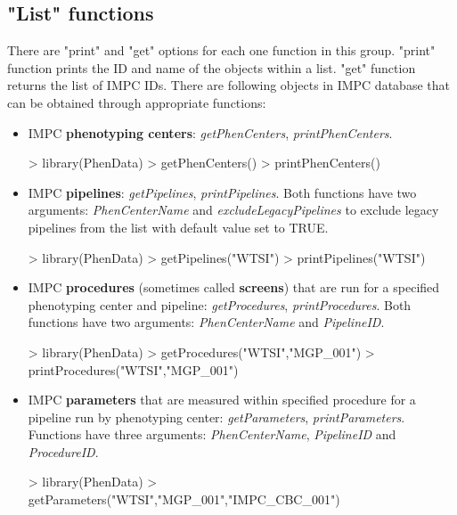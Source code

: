 \documentclass[a4paper]{article}
\begin{document}
\subsection*{"List" functions}
There are "print" and "get" options for each one function in this group. "print" function prints the ID and name of the objects within a list. "get" function returns the list of IMPC IDs. 
There are following objects in IMPC database that can be obtained through appropriate functions:
\begin{itemize}
\item IMPC \textbf{phenotyping centers}: \textit{getPhenCenters}, \textit{printPhenCenters}.
\begin{Schunk}
\begin{Sinput}
> library(PhenData)
> getPhenCenters()
> printPhenCenters()
\end{Sinput}
\end{Schunk}
\item IMPC \textbf{pipelines}: \textit{getPipelines}, \textit{printPipelines}. Both functions have two arguments: \textit{PhenCenterName} and \textit{excludeLegacyPipelines} to exclude legacy pipelines from the list with default value set to TRUE. 
\begin{Schunk}
\begin{Sinput}
> library(PhenData)
> getPipelines("WTSI")
> printPipelines("WTSI")
\end{Sinput}
\end{Schunk}
\item IMPC \textbf{procedures} (sometimes called \textbf{screens}) that are run for a specified phenotyping center and pipeline: \textit{getProcedures}, \textit{printProcedures}. Both functions have two arguments: \textit{PhenCenterName} and \textit{PipelineID}.
\begin{Schunk}
\begin{Sinput}
> library(PhenData)
> getProcedures("WTSI","MGP_001")
> printProcedures("WTSI","MGP_001")
\end{Sinput}
\end{Schunk}
\item IMPC \textbf{parameters} that are measured within specified procedure for a pipeline run by phenotyping center:  \textit{getParameters}, \textit{printParameters}. Functions have three arguments: \textit{PhenCenterName}, \textit{PipelineID} and \textit{ProcedureID}.
\begin{Schunk}
\begin{Sinput}
> library(PhenData)
> getParameters("WTSI","MGP_001","IMPC_CBC_001")

\end{Sinput}
\end{Schunk}
\end{itemize}
\end{document}
